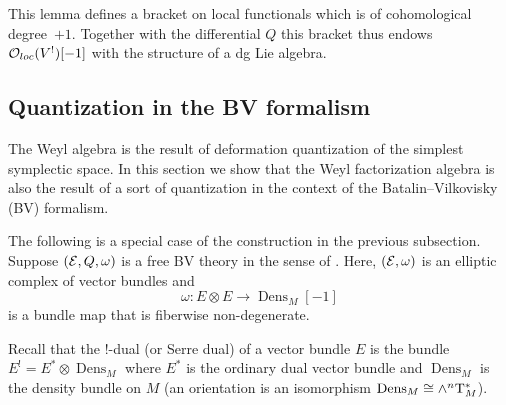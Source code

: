 \documentclass[11pt]{amsart}
\renewcommand{\op}{\operatorname}
\begin{document}
%

This lemma defines a bracket on local functionals which is of cohomological degree~$+1$.
Together with the differential $Q$ this bracket thus endows ${\mathcal O}_{loc}(V^!)[-1]$ with the structure of a dg Lie algebra.

\subsection{Quantization in the BV formalism}

The Weyl algebra is the result of deformation quantization of the simplest symplectic space.
In this section we show that the Weyl factorization algebra is also the result of a sort of quantization in the context of the Batalin--Vilkovisky (BV) formalism.

The following is a special case of the construction in the previous subsection.
Suppose $(\mathcal E,Q, \omega)$ is a free BV theory in the sense of \cite[definition 4.2.0.2]{CG2}.
Here, $(\mathcal E,\omega)$ is an elliptic complex of vector bundles and
\begin{equation}\label{eqn:nondeg}
\omega \colon E \otimes E \to \op{Dens}_M [-1]
\end{equation}
is a bundle map that is fiberwise non-degenerate.

Recall that the $!$-dual (or Serre dual) of a vector bundle $E$ is the bundle $E^! = E^* \otimes \op{Dens}_M$ where $E^*$ is the ordinary dual vector bundle and $\op{Dens}_M$ is the density bundle on $M$ (an orientation is an isomorphism $\op{Dens}_M \cong \wedge^n \T_M^*$).
\end{document}
